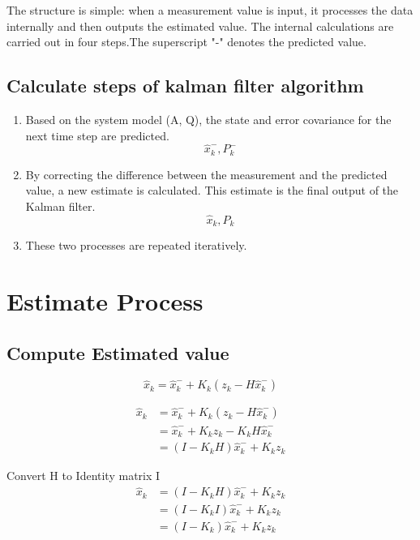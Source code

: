 \documentclass{article}
\numberwithin{equation}{section} %
\begin{document}
The structure is simple: when a measurement value is input, it processes the data internally and then outputs the estimated value. The internal calculations are carried out in four steps.The superscript "-" denotes the predicted value.

\subsection{Calculate steps of kalman filter algorithm}

\begin{enumerate}
    \item Based on the system model (A, Q), the state and error covariance for the next time step are predicted.
          \[\hat{x}^{-}_{k}, P^{-}_{k}\]
    \item By correcting the difference between the measurement and the predicted value, a new estimate is calculated. This estimate is the final output of the Kalman filter.
          \[\hat{x}_{k}, P_k\]
    \item These two processes are repeated iteratively.
\end{enumerate}

\section{Estimate Process}
\subsection{Compute Estimated value}
\begin{equation}
    \hat{x}_{k} = \hat{x}^{-}_{k} + K_{k}(z_k - H\hat{x}^{-}_{k})
\end{equation}

\begin{align}
    \hat{x}_{k} & = \hat{x}^{-}_{k} + K_{k}(z_k - H\hat{x}^{-}_{k}) \nonumber      \\
                & = \hat{x}^{-}_{k} + K_{k}z_{k} - K_{k}H\hat{x}^{-}_{k} \nonumber \\
                & = (I - K_{k}H)\hat{x}^{-}_{k} + K_{k}z_{k}
\end{align}

Convert H to Identity matrix I
\begin{align}
    \hat{x}_{k} & = (I - K_{k}H)\hat{x}^{-}_{k} + K_{k}z_{k}  \nonumber \\
                & = (I - K_{k}I)\hat{x}^{-}_{k} + K_{k}z_{k} \nonumber  \\
                & = (I - K_{k})\hat{x}^{-}_{k} + K_{k}z_{k}
\end{align}
\end{document}
